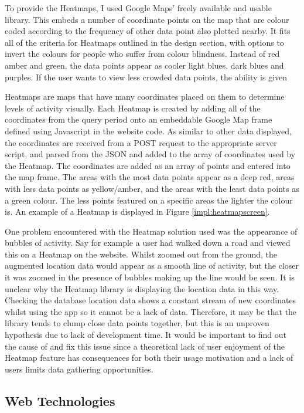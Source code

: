 \documentclass{l4proj}
\begin{document}
To provide the Heatmaps, I used Google Maps' freely available and usable library. This embeds a number of coordinate points on the map that are colour coded according to the frequency of other data point also plotted nearby. It fits all of the criteria for Heatmaps outlined in the design section, with options to invert the colours for people who suffer from colour blindness. Instead of red amber and green, the data points appear as cooler light blues, dark blues and purples. If the user wants to view less crowded data points, the ability is given 

Heatmaps are maps that have many coordinates placed on them to determine levels of activity visually. Each Heatmap is created by adding all of the coordinates from the query period onto an embeddable Google Map frame defined using Javascript in the website code. As similar to other data displayed, the coordinates are received from a POST request to the appropriate server script, and parsed from the JSON and added to the array of coordinates used by the Heatmap. The coordinates are added as an array of points and entered into the map frame. The areas with the most data points appear as a deep red, areas with less data points as yellow/amber, and the areas with the least data points as a green colour. The less points featured on a specific areas the lighter the colour is. An example of a Heatmap is displayed in Figure \ref{impl:heatmapscreen}. 

One problem encountered with the Heatmap solution used was the appearance of bubbles of activity. Say for example a user had walked down a road and viewed this on a Heatmap on the website. Whilst zoomed out from the ground, the augmented location data would appear as a smooth line of activity, but the closer it was zoomed in the presence of bubbles making up the line would be seen. It is unclear why the Heatmap library is displaying the location data in this way. Checking the database location data shows a constant stream of new coordinates whilst using the app so it cannot be a lack of data. Therefore, it may be that the library tends to clump close data points together, but this is an unproven hypothesis due to lack of development time. It would be important to find out the cause of and fix this issue since a theoretical lack of user enjoyment of the Heatmap feature has consequences for both their usage motivation and a lack of users limits data gathering opportunities.

\subsection{Web Technologies}
\end{document}
